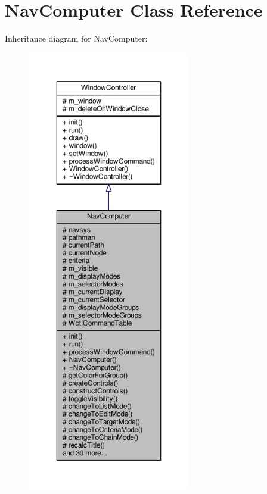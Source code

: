 \hypertarget{classNavComputer}{}\section{Nav\+Computer Class Reference}
\label{classNavComputer}


Inheritance diagram for Nav\+Computer\+:
\nopagebreak
\begin{figure}[H]
\begin{center}
\leavevmode
\includegraphics[height=550pt]{d2/d9f/classNavComputer__inherit__graph}
\end{center}
\end{figure}


